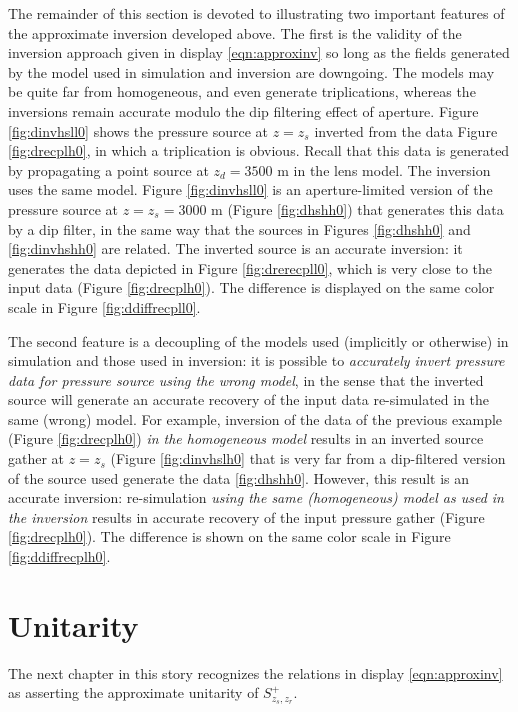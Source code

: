 The remainder of this section is devoted to illustrating two important
features of the approximate inversion developed above. The
first is the validity of the inversion approach given in display
\ref{eqn:approxinv} so long as the fields generated by the
model used in simulation and inversion are downgoing. The models
may be quite far from homogeneous, and even generate triplications,
whereas the inversions remain accurate modulo the dip filtering effect
of aperture. Figure \ref{fig:dinvhsll0} shows the pressure source at $z=z_s$
inverted from the data Figure
\ref{fig:drecplh0}, in which a triplication is obvious. Recall that
this data is generated by propagating a point source at $z_d=3500$ m
in the lens model. The inversion uses the same model. Figure
\ref{fig:dinvhsll0} is an aperture-limited version of the pressure
source at $z=z_s=3000$ m
(Figure \ref{fig:dhshh0}) that generates this data by a dip filter, in
the same way that the sources in Figures \ref{fig:dhshh0} and
\ref{fig:dinvhshh0} are related. The inverted source is an accurate
inversion: it generates the data depicted in Figure
\ref{fig:drerecpll0}, which is very close to the input data (Figure
\ref{fig:drecplh0}). The difference is displayed on the same color
scale in Figure \ref{fig:ddiffrecpll0}.

The second feature is a decoupling of the models used (implicitly or
otherwise) in simulation and those used in inversion: it is possible
to {\em accurately invert pressure data for pressure source using the
  wrong model}, in the sense that the inverted source will
generate an accurate recovery of the input data re-simulated in the
same (wrong) model. For example, inversion of the data of the previous
example (Figure \ref{fig:drecplh0}) {\em in the homogeneous model}
results in an inverted source gather at $z=z_s$ (Figure \ref{fig:dinvhslh0}
that is very far from a dip-filtered version of the source used
generate the data \ref{fig:dhshh0}. However, this result is an
accurate inversion: re-simulation {\em using the same (homogeneous)
  model as used in the inversion} results in accurate recovery of the
input pressure gather (Figure \ref{fig:drecplh0}). The difference is
shown on the same color scale in Figure \ref{fig:ddiffrecplh0}.

\section{Unitarity}

The next chapter in this story recognizes the relations in display
\ref{eqn:approxinv} as asserting the approximate unitarity of
$S^+_{z_s,z_r}$.

